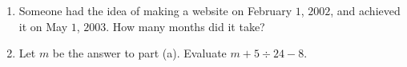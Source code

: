\begin{enumerate}
\item[(a)] Someone had the idea of making a website on February $1$, $2002$, and achieved it on May $1$, $2003$. How many months did it take?
\item[(b)] Let $m$ be the answer to part (a). Evaluate $m+5\div24-8$.
\end{enumerate}
